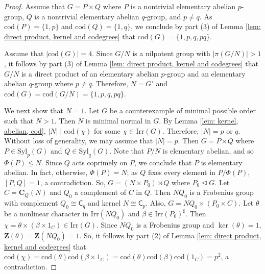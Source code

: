 \documentclass[10pt,a4paper]{amsart}
\begin{document}
\begin{proof}
  Assume that $G=P\times Q$ where $P$ is a nontrivial elementary abelian $p$-group, $Q$ is 
  a nontrivial elementary abelian $q$-group, and $p\neq q$.
  As $\mathrm{cod}(P)=\{ 1,p \}$ and $\mathrm{cod}(Q)=\{ 1,q \}$,
  we conclude by part (3) of Lemma \ref{lem: direct product, kernel and codegrees} that $\mathrm{cod}(G)=\{ 1,p,q,pq \}$.

  Assume that $|\mathrm{cod}(G)|=4$.
  Since $G/N$ is a nilpotent group with $|\pi(G/N)|>1$,
  it follows by part (3) of Lemma \ref{lem: direct product, kernel and codegrees} that $G/N$ is a direct product of an elementary abelian $p$-group
  and an elementary abelian $q$-group where $p\neq q$.
  Therefore, $N=G'$ and $\mathrm{cod}(G)=\mathrm{cod}(G/N)=\{ 1,p,q,pq \}$.
  
  We next show that $N=1$.
  Let $G$ be a counterexample of minimal possible order such that $N>1$.
 Then $N$ is minimal normal in $G$.
  By Lemma \ref{lem: kernel, abelian, cod}, $|N|\mid \mathrm{cod}(\chi)$ for some $\chi \in \mathrm{Irr}(G)$.
  Therefore, $|N|=p$ or $q$.
  Without loss of generality,
  we may assume that $|N|=p$.
  Then $G=P  \rtimes Q$ where $P\in \mathrm{Syl}_{p}(G)$ and $Q\in \mathrm{Syl}_{q}(G)$.
  Note that $P/N$ is elementary abelian,
  and so $\Phi(P)\leq N$.
  Since $Q$ acts coprimely on $P$, we conclude that $P$ is elementary abelian.
  In fact, otherwise, $\Phi(P)=N$; as $Q$ fixes every element in $P/\Phi(P)$, $[P,Q]=1$, a contradiction.
  So, $G=(N\times P_0) \rtimes Q$ where $P_0\unlhd G$.
  Let $C=\mathbf{C}_{Q}(N)$ and $Q_0$ a complement of $C$ in $Q$.
  Then $NQ_0$ is a Frobenius group with complement $Q_0\cong \mathsf{C}_{q}$ and kernel $N\cong \mathsf{C}_{p}$.
  Also, $G= NQ_0 \times (P_0\times C)$.
  Let $\theta$ be a nonlinear character in $\mathrm{Irr}(NQ_0)$ and $\beta\in \mathrm{Irr}(P_0)^\sharp$.
  Then $\chi=\theta \times (\beta\times 1_C) \in \mathrm{Irr}(G)$.
  Since $NQ_0$ is a Frobenius group and $\ker(\theta)=1$,
  $\mathbf{Z}(\theta)=\mathbf{Z}(NQ_0)=1$.
  So, it follows by part (2) of Lemma \ref{lem: direct product, kernel and codegrees} that 
  $\mathrm{cod}(\chi)=\mathrm{cod}(\theta)\mathrm{cod}(\beta\times 1_C)=\mathrm{cod}(\theta)\mathrm{cod}(\beta)\mathrm{cod}(1_C)=p^{2}$,
  a contradiction.
\end{proof}
\end{document}

